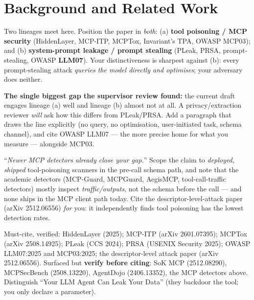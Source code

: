 \documentclass[11pt]{article}
\begin{document}
\section{Background and Related Work}\label{sec:related}
\begin{saybox}
Two lineages meet here. Position the paper in \emph{both}: (a) \textbf{tool poisoning / MCP security} (HiddenLayer, MCP-ITP, MCPTox, Invariant's TPA, OWASP MCP03); and (b) \textbf{system-prompt leakage / prompt stealing} (PLeak, PRSA, prompt-stealing, OWASP \textbf{LLM07}). Your distinctiveness is sharpest against (b): every prompt-stealing attack \emph{queries the model directly and optimises}; your adversary does neither.
\end{saybox}
\begin{hidebox}
\textbf{The single biggest gap the supervisor review found:} the current draft engages lineage (a) well and lineage (b) almost not at all. A privacy/extraction reviewer \emph{will} ask how this differs from PLeak/PRSA. Add a paragraph that draws the line explicitly (no query, no optimisation, user-initiated task, schema channel), and cite OWASP LLM07 --- the more precise home for what you measure --- alongside MCP03.
\end{hidebox}
\begin{trapbox}
``\emph{Newer MCP detectors already close your gap.}'' Scope the claim to \emph{deployed, shipped} tool-poisoning scanners in the pre-call schema path, and note that the academic detectors (MCP-Guard, MCPGuard, AegisMCP, tool-call-traffic detectors) mostly inspect \emph{traffic/outputs}, not the schema before the call --- and none ships in the MCP client path today. Cite the descriptor-level-attack paper (arXiv 2512.06556) \emph{for} you: it independently finds tool poisoning has the lowest detection rates.
\end{trapbox}
\begin{phrasebox}
Must-cite, verified: HiddenLayer (2025); MCP-ITP (arXiv 2601.07395); MCPTox (arXiv 2508.14925); PLeak (CCS 2024); PRSA (USENIX Security 2025); OWASP LLM07:2025 and MCP03:2025; the descriptor-level attack paper (arXiv 2512.06556). Surfaced but \textbf{verify before citing}: SoK MCP (2512.08290), MCPSecBench (2508.13220), AgentDojo (2406.13352), the MCP detectors above. Distinguish ``Your LLM Agent Can Leak Your Data'' (they backdoor the tool; you only declare a parameter).
\end{phrasebox}
\end{document}
